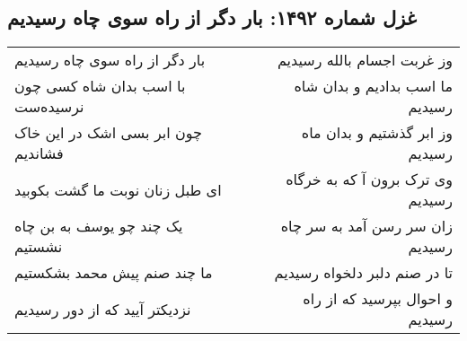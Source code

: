 \begin{center}
\section*{غزل شماره ۱۴۹۲: بار دگر از راه سوی چاه رسیدیم}
\label{sec:1492}
\begin{longtable}{l p{0.5cm} r}
بار دگر از راه سوی چاه رسیدیم
&&
وز غربت اجسام بالله رسیدیم
\\
با اسب بدان شاه کسی چون نرسیده‌ست
&&
ما اسب بدادیم و بدان شاه رسیدیم
\\
چون ابر بسی اشک در این خاک فشاندیم
&&
وز ابر گذشتیم و بدان ماه رسیدیم
\\
ای طبل زنان نوبت ما گشت بکوبید
&&
وی ترک برون آ که به خرگاه رسیدیم
\\
یک چند چو یوسف به بن چاه نشستیم
&&
زان سر رسن آمد به سر چاه رسیدیم
\\
ما چند صنم پیش محمد بشکستیم
&&
تا در صنم دلبر دلخواه رسیدیم
\\
نزدیکتر آیید که از دور رسیدیم
&&
و احوال بپرسید که از راه رسیدیم
\\
\end{longtable}
\end{center}
